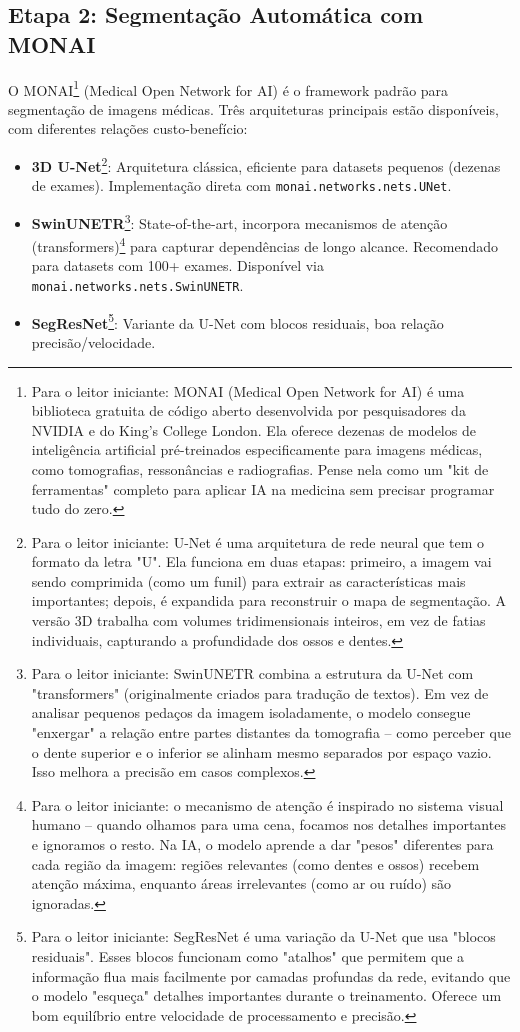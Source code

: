 \subsection{Etapa 2: Segmentação Automática com MONAI}

O MONAI\footnote{Para o leitor iniciante: MONAI (Medical Open Network for AI) é uma biblioteca gratuita de código aberto desenvolvida por pesquisadores da NVIDIA e do King's College London. Ela oferece dezenas de modelos de inteligência artificial pré-treinados especificamente para imagens médicas, como tomografias, ressonâncias e radiografias. Pense nela como um "kit de ferramentas" completo para aplicar IA na medicina sem precisar programar tudo do zero.} (Medical Open Network for AI) é o framework padrão para segmentação de imagens médicas. Três arquiteturas principais estão disponíveis, com diferentes relações custo-benefício:

\begin{itemize}
    \item \textbf{3D U-Net}\footnote{Para o leitor iniciante: U-Net é uma arquitetura de rede neural que tem o formato da letra "U". Ela funciona em duas etapas: primeiro, a imagem vai sendo comprimida (como um funil) para extrair as características mais importantes; depois, é expandida para reconstruir o mapa de segmentação. A versão 3D trabalha com volumes tridimensionais inteiros, em vez de fatias individuais, capturando a profundidade dos ossos e dentes.}: Arquitetura clássica, eficiente para datasets pequenos (dezenas de exames). Implementação direta com \texttt{monai.networks.nets.UNet}.
    \item \textbf{SwinUNETR}\footnote{Para o leitor iniciante: SwinUNETR combina a estrutura da U-Net com "transformers" (originalmente criados para tradução de textos). Em vez de analisar pequenos pedaços da imagem isoladamente, o modelo consegue "enxergar" a relação entre partes distantes da tomografia -- como perceber que o dente superior e o inferior se alinham mesmo separados por espaço vazio. Isso melhora a precisão em casos complexos.}: State-of-the-art, incorpora mecanismos de atenção (transformers)\footnote{Para o leitor iniciante: o mecanismo de atenção é inspirado no sistema visual humano -- quando olhamos para uma cena, focamos nos detalhes importantes e ignoramos o resto. Na IA, o modelo aprende a dar "pesos" diferentes para cada região da imagem: regiões relevantes (como dentes e ossos) recebem atenção máxima, enquanto áreas irrelevantes (como ar ou ruído) são ignoradas.} para capturar dependências de longo alcance. Recomendado para datasets com 100+ exames. Disponível via \texttt{monai.networks.nets.SwinUNETR}.
    \item \textbf{SegResNet}\footnote{Para o leitor iniciante: SegResNet é uma variação da U-Net que usa "blocos residuais". Esses blocos funcionam como "atalhos" que permitem que a informação flua mais facilmente por camadas profundas da rede, evitando que o modelo "esqueça" detalhes importantes durante o treinamento. Oferece um bom equilíbrio entre velocidade de processamento e precisão.}: Variante da U-Net com blocos residuais, boa relação precisão/velocidade.
\end{itemize}

